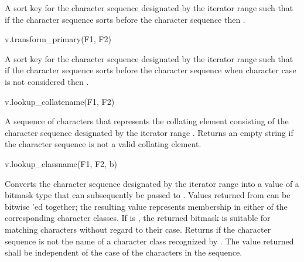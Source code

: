 \begin{itemdescr}
\pnum
\result
{}

\pnum
\returns
A sort key for the character sequence designated by
the iterator range  such that
if the character sequence  sorts before
the character sequence 
then .
\end{itemdescr}

\begin{itemdecl}
v.transform_primary(F1, F2)
\end{itemdecl}

\begin{itemdescr}
\pnum
{}%
%
\result
{}

\pnum
\returns
A sort key for the character sequence designated by
the iterator range  such that
if the character sequence  sorts before
the character sequence 
when character case is not considered
then .
\end{itemdescr}

\begin{itemdecl}
v.lookup_collatename(F1, F2)
\end{itemdecl}

\begin{itemdescr}
\pnum
\result
{}

\pnum
\returns
A sequence of characters that represents the collating element
consisting of the character sequence designated by
the iterator range .
Returns an empty string
if the character sequence is not a valid collating element.
\end{itemdescr}

\begin{itemdecl}
v.lookup_classname(F1, F2, b)
\end{itemdecl}

\begin{itemdescr}
\pnum
\result
{}

\pnum
\returns
Converts the character sequence designated by the iterator range
 into a value of a bitmask type that can
subsequently be passed to .
Values returned from  can be bitwise 'ed together;
the resulting value represents membership
in either of the corresponding character classes.
If  is , the returned bitmask is suitable for
matching characters without regard to their case.
Returns 
if the character sequence is not the name of
a character class recognized by  .
The value returned shall be independent of
the case of the characters in the sequence.
\end{itemdescr}

